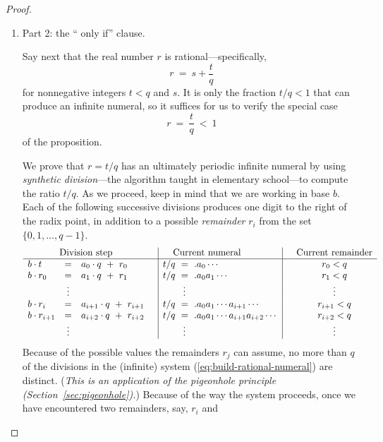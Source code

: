 \begin{proof}
\begin{enumerate}
\item 
{\small\sf Part 2: the `` only if'' clause.}

Say next that the real number $r$ is rational---specifically,
\[ r \ = \ s + \frac{t}{q} \]
for nonnegative integers $t < q$ and $s$.  It is only the fraction
$t/q < 1$ that can produce an infinite numeral, so it suffices for us
to verify the special case
\[ r \ = \ \frac{t}{q} \ < \ 1 \]
of the proposition.

We prove that $r = t/q$ has an ultimately periodic infinite numeral by
using  {\it synthetic division}---the
algorithm taught in elementary school---to compute the ratio $t/q$.
As we proceed, keep in mind that we are working in base $b$.  Each of
the following successive divisions produces one digit to the right of
the radix point, in addition to a possible {\it remainder} $r_i$ from
the set $\{0, 1, \ldots, q-1\}$.
\begin{equation}
\label{eq:build-rational-numeral}
\begin{array}{lclc|l|cc}
\multicolumn{3}{c}{\mbox{Division step}} & &  \hspace*{.15in} \mbox{Current numeral} & &
\mbox{Current remainder} \\
\hline
b \cdot t   & = & a_0 \cdot q \ + \ r_0 &
      & t/q \ = \ .a_0 \cdots &
      & r_0 < q \\
b \cdot r_0 & = & a_1 \cdot q \ + \ r_1 &
      & t/q \ = \ .a_0 a_1 \cdots &
      & r_1 < q \\
            & \vdots &  & & \hspace*{.3in} \vdots &  & \vdots \\
b \cdot r_i & = & a_{i+1} \cdot q \ + \ r_{i+1} &
      & t/q \ = \ .a_0 a_1 \cdots a_{i+1} \cdots &
      & r_{i+1} < q \\
b \cdot r_{i+1} & = & a_{i+2} \cdot q \ + \ r_{i+2} &
      & t/q \ = \ .a_0 a_1 \cdots a_{i+1} a_{i+2} \cdots &
      & r_{i+2} < q \\
            & \vdots &  & &  \hspace*{.3in}\vdots & & \vdots   \\
\end{array}
\end{equation}
Because of the possible values the remainders $r_j$ can assume, no
more than $q$ of the divisions in the (infinite) system
(\ref{eq:build-rational-numeral}) are distinct.  ({\em This is an
  application of the pigeonhole principle
  (Section~\ref{sec:pigeonhole}).})  Because of the way the system
proceeds, once we have encountered two remainders, say, $r_i$ and

\end{enumerate}
\end{proof}
